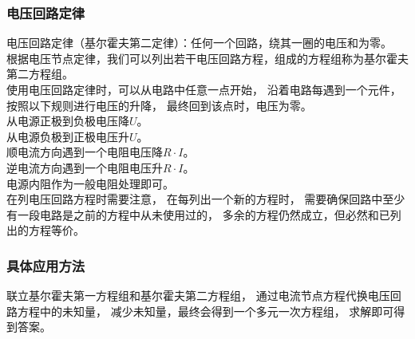 \documentclass[UTF8]{ctexart}
\begin{document}
\subsubsection{电压回路定律}
    电压回路定律（基尔霍夫第二定律）：任何一个回路，绕其一圈的电压和为零。\\[3mm]
    根据电压节点定律，我们可以列出若干电压回路方程，组成的方程组称为基尔霍夫第二方程组。\\[3mm]
    使用电压回路定律时，可以从电路中任意一点开始，
    沿着电路每遇到一个元件，按照以下规则进行电压的升降，
    最终回到该点时，电压为零。\\[3mm]
    从电源正极到负极电压降$U$。\\[2mm]
    从电源负极到正极电压升$U$。\\[2mm]
    顺电流方向遇到一个电阻电压降$R\cdot I$。\\[2mm]
    逆电流方向遇到一个电阻电压升$R\cdot I$。\\[2mm]
    电源内阻作为一般电阻处理即可。\\[3mm]
    在列电压回路方程时需要注意，
    在每列出一个新的方程时，
    需要确保回路中至少有一段电路是之前的方程中从未使用过的，
    多余的方程仍然成立，但必然和已列出的方程等价。

\subsubsection{具体应用方法}
    联立基尔霍夫第一方程组和基尔霍夫第二方程组，
    通过电流节点方程代换电压回路方程中的未知量，
    减少未知量，最终会得到一个多元一次方程组，
    求解即可得到答案。

\newpage
\end{document}
